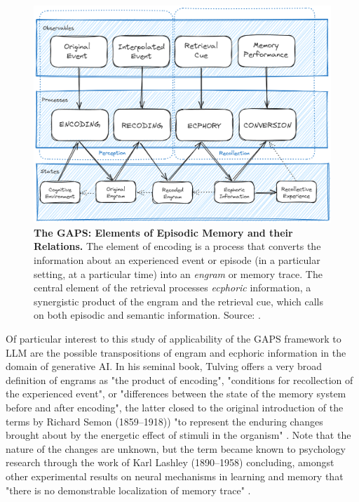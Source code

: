 \documentclass[11pt]{article}
\begin{document}
\begin{figure}[htbp]
\centering
\includegraphics[width=.9\linewidth]{ElementsOfRemembering-rev.png}
\caption{\label{fig:orgd9de8b9}\textbf{The GAPS: Elements of Episodic Memory and their Relations.} The element of encoding is a process that converts the information about an experienced event or episode (in a particular setting, at a particular time) into an \emph{engram} or memory trace. The central element of the retrieval processes \emph{ecphoric} information, a synergistic product of the engram and the retrieval cue, which calls on both episodic and semantic information. Source: \citep[Ch. 7, Fig. 7-1, p. 135]{Tulving1983}.}
\end{figure}

Of particular interest to this study of applicability of the GAPS framework to LLM are the possible transpositions of engram and ecphoric information in the domain of generative AI. In his seminal book, Tulving offers a very broad definition of engrams as "the product of encoding", "conditions for recollection of the experienced event", or "differences between the state of the memory system before and after encoding", the latter closed to the original introduction of the terms by Richard Semon (1859--1918)) "to represent the enduring changes brought about by the energetic effect of stimuli in the organism" \citep{SCHACTER1978721,Semon}. Note that the nature of the changes are unknown, but the term became known to psychology research through the work of Karl Lashley (1890--1958) concluding, amongst other experimental results on neural mechanisms in learning and memory that "there is no demonstrable localization of memory trace" \citep{lashley1950search}.
\end{document}
